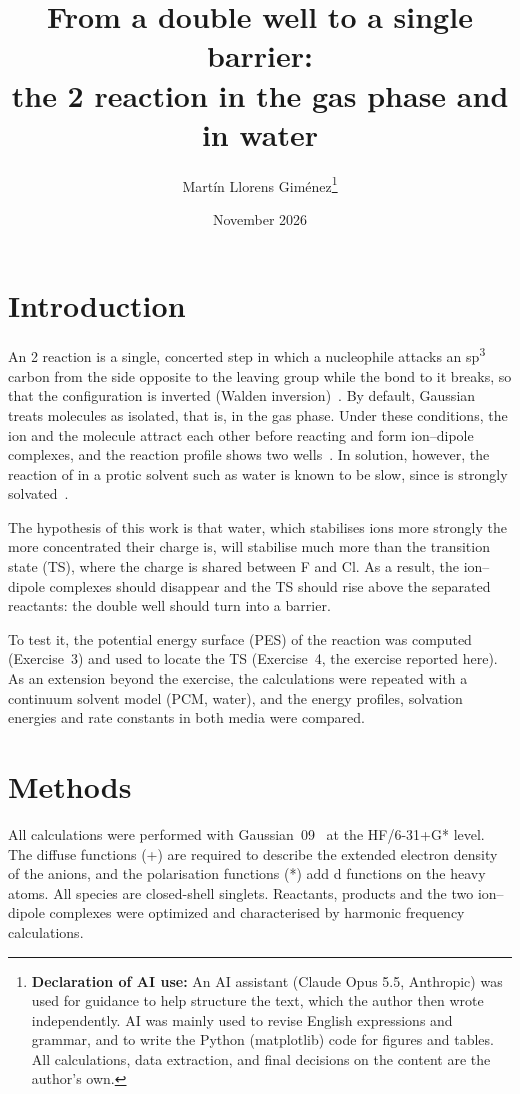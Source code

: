 \documentclass[10pt,a4paper]{article}
\title{From a double well to a single barrier:\\the \ce{S_N}2 reaction
\ce{F- + CH3Cl} in the gas phase and in water}
\author{Martín Llorens Giménez\thanks{\textbf{Declaration of AI use:} An AI assistant (Claude Opus 5.5, Anthropic) was used for guidance to help structure the text, which the author then wrote independently. AI was mainly used to revise English expressions and grammar, and to write the Python (matplotlib) code for figures and tables. All calculations, data extraction, and final decisions on the content are the author's own.}}
\date{November 2026}
\begin{document}
\maketitle


\section{Introduction} %

An 2 reaction is a single, concerted step in which a nucleophile
attacks an sp\textsuperscript{3} carbon from the side opposite to the
leaving group while the bond to it breaks, so that the configuration is
inverted (Walden inversion)~\cite{Clayden2012}. By default, Gaussian
treats molecules as isolated, that is, in the gas phase. Under these
conditions, the ion and the molecule attract each other before reacting
and form ion--dipole complexes, and the reaction profile shows two
wells~\cite{Olmstead1977}. In solution, however, the  reaction
of  in a protic solvent such as water is known to be slow, since
 is strongly solvated~\cite{Clayden2012}.

The hypothesis of this work is that water, which stabilises ions more
strongly the more concentrated their charge is, will stabilise 
much more than the transition state (TS), where the charge is shared
between F and Cl. As a result, the ion--dipole complexes should
disappear and the TS should rise above the separated reactants: the
double well should turn into a barrier.

To test it, the potential energy surface (PES) of the reaction
 was computed (Exercise~3) and used to
locate the TS (Exercise~4, the exercise reported here). As an extension
beyond the exercise, the calculations were repeated with a continuum
solvent model (PCM, water), and the energy profiles, solvation energies
and rate constants in both media were compared.

\section{Methods} %

All calculations were performed with Gaussian~09~\cite{gaussian09} at the
HF/6-31+G* level. The diffuse functions (+) are required to describe the
extended electron density of the anions, and the polarisation functions (*) add
d functions on the heavy atoms. All species are closed-shell singlets. Reactants,
products and the two ion--dipole complexes were optimized and characterised by
harmonic frequency calculations.
\end{document}
